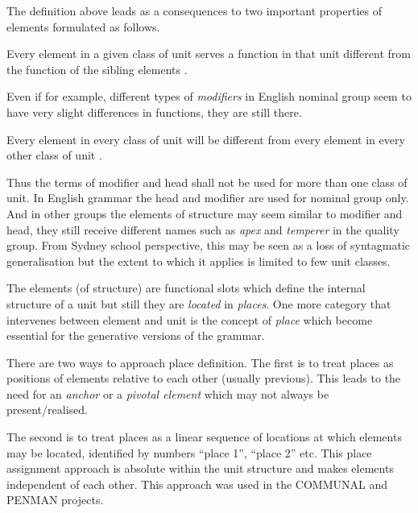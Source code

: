 The definition above leads as a consequences to two important properties of elements formulated as follows.

\begin{generalization}
Every element in a given class of unit serves a function in that unit different from the function of the sibling elements \citep[214]{Fawcett2000}. 
\end{generalization} 

Even if for example, different types of \textit{modifiers} in English nominal group seem to have very slight differences in functions, they are still there.

\begin{generalization}
    Every element in every class of unit will be different from every element in every other class of unit \citep[214]{Fawcett2000}. 
\end{generalization} 

Thus the terms of modifier and head shall not be used for more than one class of unit. In English grammar the head and modifier are used for nominal group only. And in other groups the elements of structure may seem similar to modifier and head, they still receive different names such as \textit{apex} and \textit{temperer} in the quality group. From Sydney school perspective, this may be seen as a loss of syntagmatic generalisation but the extent to which it applies is limited to few unit classes.

The elements (of structure) are functional slots which define the internal structure of a unit but still they are \textit{located} in \textit{places}. One more category that intervenes between element and unit is the concept of \textit{place} which become essential for the generative versions of the grammar.

There are two ways to approach place definition. The first is to treat places as positions of elements relative to each other (usually previous). This leads to the need for an \textit{anchor} or a \textit{pivotal element} which may not always be present/realised.

The second is to treat places as a linear sequence of locations at which elements may be located, identified by numbers ``place 1'', ``place 2'' etc. This place assignment approach is absolute within the unit structure and makes elements independent of each other. This approach was used in the COMMUNAL \citep{Fawcett90-communal} and PENMAN \citep{PenmanOverview} projects. 

